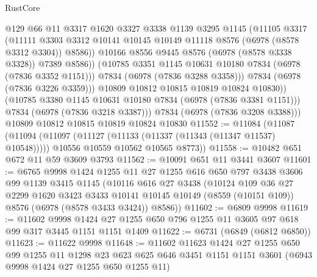 \begin{lexlean}{RustCore}
\begin{coremodule}
                    @129
                    @66
                    @11
                    @3317
                    @1620
                    @3327
                    @3338
                    @1139
                    @3295
                    @1145
                    (@11105
                      @3317
                      (@11111
                        @3303
                        @3312
                        @10141
                        @10145
                        @10149
                        @11118
                        @8576
                        (@6978 (@8578 @3312 @3304))
                        @8586))
                    @10166
                    @8556
                    @9445
                    @8576
                    (@6978 (@8578 @3338 @3328))
                    @7389
                    @8586))
                (@10785 @3351 @1145 @10631 @10180 @7834 (@6978 (@7836 @3352 @1151)))
                @7834
                (@6978 (@7836 @3288 @3358)))
              @7834
              (@6978 (@7836 @3226 @3359)))
            @10809
            @10812
            @10815
            @10819
            @10824
            @10830))
        (@10785 @3380 @1145 @10631 @10180 @7834 (@6978 (@7836 @3381 @1151)))
        @7834
        (@6978 (@7836 @3218 @3387)))
      @7834
      (@6978 (@7836 @3208 @3388)))
    @10809
    @10812
    @10815
    @10819
    @10824
    @10830
@11552 := @11084
    (@11087
      (@11094
        (@11097 (@11127 (@11133 (@11337 (@11343 (@11347 @11537) @10548)))))
        @10556
        @10559
        @10562
        @10565
        @8773))
@11558 := @10482 @651 @672 @11 @59 @3609 @3793
@11562 := @10091 @651 @11 @3441 @3607
@11601 := @6765
    @9998
    @1424
    @1255
    @11
    @27
    @1255
    @616
    @650
    @797
    @3438
    @3606
    @99
    @1139
    @3415
    @1145
    (@10116
      @616
      @27
      @3438
      (@10124
        @109
        @36
        @27
        @2299
        @1620
        @3423
        @3433
        @10141
        @10145
        @10149
        (@8559 (@10151 @109))
        @8576
        (@6978 (@8578 @3433 @3424))
        @8586))
@11602 := @6809 @9998
@11619 := @11602
    @9998
    @1424
    @27
    @1255
    @650
    @796
    @1255
    @11
    @3605
    @97
    @618
    @99
    @317
    @3445
    @1151
    @1151
    @1409
@11622 := @6731 (@6849 (@6812 @6850))
@11623 := @11622 @9998
@11648 := @11602
    @11623
    @1424
    @27
    @1255
    @650
    @99
    @1255
    @11
    @1298
    @23
    @623
    @625
    @646
    @3451
    @1151
    @1151
    @3601
    (@6943 @9998 @1424 @27 @1255 @650 @1255 @11)

\end{coremodule}
\end{lexlean}
